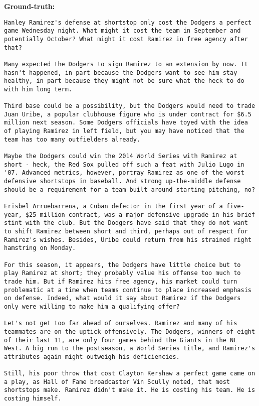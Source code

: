 {\bf\ttfamily Ground-truth: }
\begin{lstlisting}
Hanley Ramirez's defense at shortstop only cost the Dodgers a perfect game Wednesday night. What might it cost the team in September and potentially October? What might it cost Ramirez in free agency after that?

Many expected the Dodgers to sign Ramirez to an extension by now. It hasn't happened, in part because the Dodgers want to see him stay healthy, in part because they might not be sure what the heck to do with him long term.

Third base could be a possibility, but the Dodgers would need to trade Juan Uribe, a popular clubhouse figure who is under contract for $6.5 million next season. Some Dodgers officials have toyed with the idea of playing Ramirez in left field, but you may have noticed that the team has too many outfielders already.

Maybe the Dodgers could win the 2014 World Series with Ramirez at short - heck, the Red Sox pulled off such a feat with Julio Lugo in '07. Advanced metrics, however, portray Ramirez as one of the worst defensive shortstops in baseball. And strong up-the-middle defense should be a requirement for a team built around starting pitching, no?

Erisbel Arruebarrena, a Cuban defector in the first year of a five-year, $25 million contract, was a major defensive upgrade in his brief stint with the club. But the Dodgers have said that they do not want to shift Ramirez between short and third, perhaps out of respect for Ramirez's wishes. Besides, Uribe could return from his strained right hamstring on Monday.

For this season, it appears, the Dodgers have little choice but to play Ramirez at short; they probably value his offense too much to trade him. But if Ramirez hits free agency, his market could turn problematic at a time when teams continue to place increased emphasis on defense. Indeed, what would it say about Ramirez if the Dodgers only were willing to make him a qualifying offer?

Let's not get too far ahead of ourselves. Ramirez and many of his teammates are on the uptick offensively. The Dodgers, winners of eight of their last 11, are only four games behind the Giants in the NL West. A big run to the postseason, a World Series title, and Ramirez's attributes again might outweigh his deficiencies.

Still, his poor throw that cost Clayton Kershaw a perfect game came on a play, as Hall of Fame broadcaster Vin Scully noted, that most shortstops make. Ramirez didn't make it. He is costing his team. He is costing himself.


\end{lstlisting}
